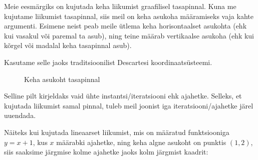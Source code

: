 \begin{flushleft}


Meie eesmärgiks on kujutada keha liikumist graafilisel tasapinnal. Kuna me kujutame liikumist tasapinnal, siis meil on keha asukoha määramiseks vaja kahte argumenti. Esimene neist peab meile ütlema keha horisontaalset asukohta (ehk kui vasakul või paremal ta asub), ning teine määrab vertikaalse asukoha (ehk kui kõrgel või madalal keha tasapinnal asub). 


Kasutame selle jaoks traditsioonilist Descartesi koordinaatsüsteemi.

\begin{figure}[h]  
\centering 
{}
\caption{Keha asukoht tasapinnal}
\label{Joonis 1}
\end{figure}


Selline pilt kirjeldaks vaid ühte instantsi/iteratsiooni ehk ajahetke.
Selleks, et kujutada liikumist samal pinnal, tuleb meil joonist iga iteratsiooni/ajahetke järel uuendada.

Näiteks kui kujutada lineaarset liikumist, mis on määratud funktsiooniga $y=x+1$, kus $x$ määrabki ajahetke, ning keha algne asukoht on punktis $(1,2)$, siis saaksime järgmise kolme ajahetke jaoks kolm järgmist kaadrit:

\begin{figure}[h]  
\centering 


\end{figure}
\end{flushleft}

